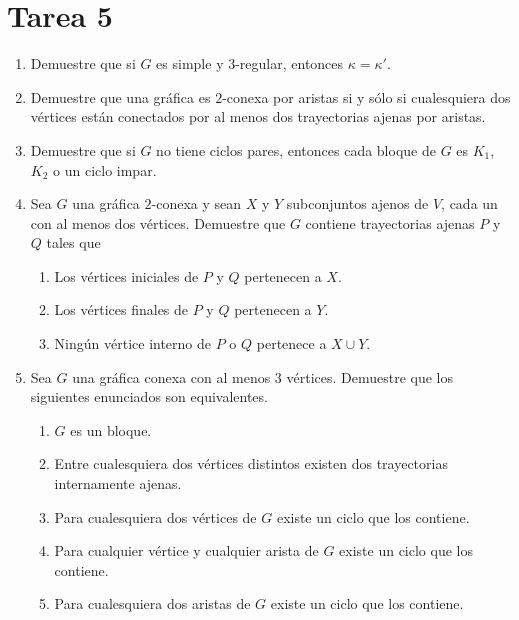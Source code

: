 \documentclass{article}
\begin{document}
\section*{\LARGE{Tarea 5}}
\begin{enumerate}
\item Demuestre que si $G$ es simple y $3$-regular, entonces $\kappa =
  \kappa'$.

\item Demuestre que una gr\'afica es $2$-conexa por aristas si y s\'olo si
  cualesquiera dos v\'ertices est\'an conectados por al menos dos trayectorias
  ajenas por aristas.

\item Demuestre que si $G$ no tiene ciclos pares, entonces cada bloque de $G$
  es $K_1$, $K_2$ o un ciclo impar.

\item Sea $G$ una gr\'afica $2$-conexa y sean $X$ y $Y$ subconjuntos ajenos de
  $V$, cada un con al menos dos v\'ertices.   Demuestre que $G$ contiene
  trayectorias ajenas $P$ y $Q$ tales que
  \begin{enumerate}
  \item Los v\'ertices iniciales de $P$ y $Q$ pertenecen a $X$.

  \item Los v\'ertices finales de $P$ y $Q$ pertenecen a $Y$.

  \item Ning\'un v\'ertice interno de $P$ o $Q$ pertenece a $X \cup Y$.
  \end{enumerate}

\item Sea $G$ una gr\'afica conexa con al menos 3 v\'ertices. Demuestre que
  los siguientes enunciados son equivalentes.
  \begin{enumerate}
  \item $G$ es un bloque.

  \item Entre cualesquiera dos v\'ertices distintos existen dos trayectorias
    internamente ajenas.

  \item Para cualesquiera dos v\'ertices de $G$ existe un ciclo que los
    contiene.

  \item Para cualquier v\'ertice y cualquier arista de $G$ existe un ciclo
    que los contiene.

  \item Para cualesquiera dos aristas de $G$ existe un ciclo que los
    contiene.


\end{enumerate}
\end{enumerate}
\end{document}
